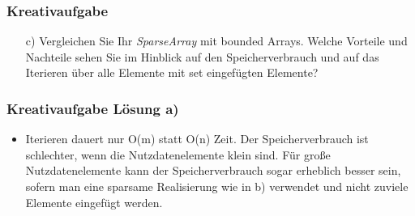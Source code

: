 \begin{frame}
	\frametitle{Kreativaufgabe}

	\begin{itemize}
		\item[c)] Vergleichen Sie Ihr \textit{SparseArray} mit bounded Arrays. Welche Vorteile und Nachteile sehen
			Sie im Hinblick auf den Speicherverbrauch und auf das Iterieren über alle Elemente mit set eingefügten Elemente?
	\end{itemize}

\end{frame}

\begin{frame}
	\frametitle{Kreativaufgabe Lösung a)}
	\begin{itemize}
		\item Iterieren dauert nur O(m) statt O(n) Zeit. Der Speicherverbrauch ist schlechter, wenn die
			Nutzdatenelemente klein sind. Für große Nutzdatenelemente kann der Speicherverbrauch sogar erheblich besser sein,
			sofern man eine sparsame Realisierung wie in b) verwendet und nicht zuviele Elemente eingefügt werden.
	\end{itemize}
\end{frame}



